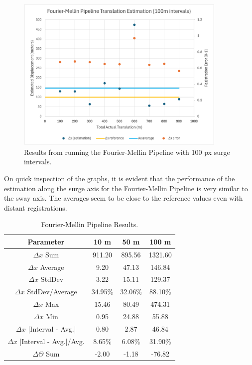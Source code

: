 \begin{figure}[H]
  \centering
  \includegraphics[width=0.9\textwidth]{figures/results/Thesis-Surge/FMT-9.png}
  \caption{Results from running the Fourier-Mellin Pipeline with 100 px surge intervals.}
\end{figure}

On quick inspection of the graphs, it is evident that the performance of the estimation along the surge axis for the Fourier-Mellin Pipeline is very similar to the sway axis. The averages seem to be close to the reference values even with distant registrations. 

\begin{table}[H]
    \centering
    \begin{tabular}{|c|c|c|c|}
        \hline
        \textbf{Parameter} & \textbf{10 m} & \textbf{50 m} & \textbf{100 m} \\ \hline
        \(\Delta x\) Sum & 911.20 & 895.56 & 1321.60 \\ \hline
        \(\Delta x\) Average & 9.20 & 47.13 & 146.84 \\ \hline
        \(\Delta x\) StdDev & 3.22 & 15.11 & 129.37 \\ \hline
        \(\Delta x\) StdDev/Average & 34.95\% & 32.06\% & 88.10\% \\ \hline
        \(\Delta x\) Max & 15.46 & 80.49 & 474.31 \\ \hline
        \(\Delta x\) Min & 0.95 & 24.88 & 55.88 \\ \hline
        \(\Delta x\) |Interval - Avg.| & 0.80 & 2.87 & 46.84 \\ \hline
        \(\Delta x\) |Interval - Avg.|/Avg. & 8.65\% & 6.08\% & 31.90\% \\ \hline
        \(\Delta\Theta\) Sum & -2.00 & -1.18 & -76.82 \\ \hline
    \end{tabular}
    \caption{Fourier-Mellin Pipeline Results.}
\end{table}

